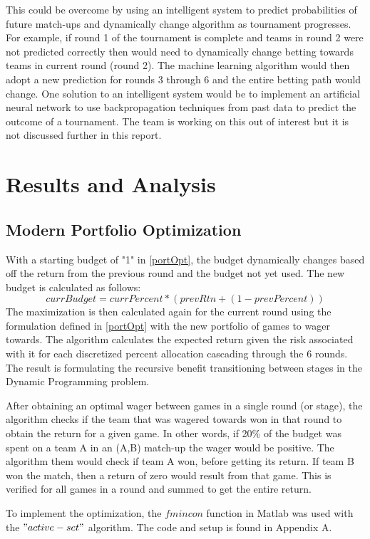 \documentclass[12pt]{article}
\begin{document}
This could be overcome by using an intelligent system to predict probabilities of future match-ups and dynamically change algorithm as tournament progresses. 
For example, if round 1 of the tournament is complete and teams in round 2 were not predicted correctly then would need to dynamically change betting towards teams in current round (round 2).
The machine learning algorithm would then adopt a new prediction for rounds 3 through 6 and the entire betting path would change.
One solution to an intelligent system would be to implement an artificial neural network to use backpropagation techniques from past data to predict the outcome of a tournament. 
The team is working on this out of interest but it is not discussed further in this report.

\section{Results and Analysis}
\subsection{Modern Portfolio Optimization}
With a starting budget of "1" in \eqref{portOpt}, the budget dynamically changes based off the return from the previous round and the budget not yet used.
The new budget is calculated as follows:
\begin{equation*}
currBudget = currPercent*(prevRtn + (1-prevPercent))
\end{equation*}
The maximization is then calculated again for the current round using the formulation defined in \eqref{portOpt} with the new portfolio of games to wager towards.
The algorithm calculates the expected return given the risk associated with it for each discretized percent allocation cascading through the 6 rounds.
The result is formulating the recursive benefit transitioning between stages in the Dynamic Programming problem.

After obtaining an optimal wager between games in a single round (or stage), the algorithm checks if the team that was wagered towards won in that round to obtain the return for a given game.
In other words, if 20\% of the budget was spent on a team A in an (A,B) match-up the wager would be positive.
The algorithm them would check if team A won, before getting its return.
If team B won the match, then a return of zero would result from that game.
This is verified for all games in a round and summed to get the entire return.

To implement the optimization, the $fmincon$ function in Matlab was used with the $"active-set"$ algorithm.
The code and setup is found in Appendix A.
\end{document}
